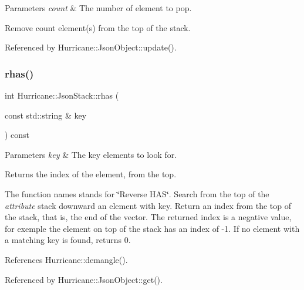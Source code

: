 \begin{DoxyParams}{Parameters}
{\em count} & The number of element to pop.\\
\hline
\end{DoxyParams}
Remove {\ttfamily count} element(s) from the top of the stack. 

Referenced by Hurricane\+::\+Json\+Object\+::update().

\mbox{\label{classHurricane_1_1JsonStack_a6416903ee046d6b8122fe2ffe8c0751b}} 
\subsubsection{\texorpdfstring{rhas()}{rhas()}}
{\footnotesize\ttfamily int Hurricane\+::\+Json\+Stack\+::rhas (\begin{DoxyParamCaption}\item[{const std\+::string \&}]{key }\end{DoxyParamCaption}) const\hspace{0.3cm}{\ttfamily [inline]}}


\begin{DoxyParams}{Parameters}
{\em key} & The key element\textquotesingle{}s to look for. \\
\hline
\end{DoxyParams}
\begin{DoxyReturn}{Returns}
the index of the element, from the top.
\end{DoxyReturn}
The function name\textquotesingle{}s stands for \char`\"{}\+Reverse H\+A\+S\char`\"{}. Search from the top of the {\itshape attribute} stack downward an element with {\ttfamily key}. Return an index from the top of the stack, that is, the end of the vector. The returned index is a negative value, for exemple the element on top of the stack has an index of {\ttfamily -\/1}. If no element with a matching key is found, returns 0. 

References Hurricane\+::demangle().



Referenced by Hurricane\+::\+Json\+Object\+::get().

\mbox{\label{classHurricane_1_1JsonStack_aed841c5329cfb5a72e7df326e995ce73}} 
